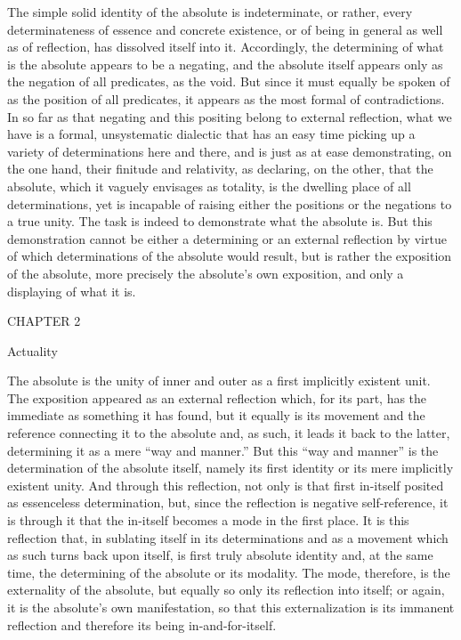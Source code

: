 The simple solid identity of the absolute is indeterminate,
or rather, every determinateness of essence and concrete existence,
or of being in general as well as of reflection,
has dissolved itself into it.
Accordingly, the determining of what is
the absolute appears to be a negating,
and the absolute itself appears only as
the negation of all predicates, as the void.
But since it must equally be spoken of
as the position of all predicates,
it appears as the most formal of contradictions.
In so far as that negating and this positing
belong to external reflection,
what we have is a formal, unsystematic dialectic
that has an easy time picking up
a variety of determinations here and there,
and is just as at ease demonstrating, on the one hand,
their finitude and relativity, as declaring, on the other,
that the absolute, which it vaguely envisages as totality,
is the dwelling place of all determinations,
yet is incapable of raising either
the positions or the negations to a true unity.
The task is indeed to demonstrate what the absolute is.
But this demonstration cannot be either
a determining or an external reflection
by virtue of which determinations of the absolute would result,
but is rather the exposition of the absolute,
more precisely the absolute's own exposition,
and only a displaying of what it is.

CHAPTER 2

Actuality

The absolute is the unity of inner and outer
as a first implicitly existent unit.
The exposition appeared as an external reflection
which, for its part, has the immediate as something it has found,
but it equally is its movement and
the reference connecting it to the absolute
and, as such, it leads it back to the latter,
determining it as a mere “way and manner.”
But this “way and manner” is the determination of the absolute itself,
namely its first identity or its mere implicitly existent unity.
And through this reflection, not only is that
first in-itself posited as essenceless determination,
but, since the reflection is negative self-reference,
it is through it that the in-itself becomes
a mode in the first place.
It is this reflection that, in sublating itself in its
determinations and as a movement which as such turns back upon itself,
is first truly absolute identity
and, at the same time, the determining of
the absolute or its modality.
The mode, therefore, is the externality of the absolute,
but equally so only its reflection into itself;
or again, it is the absolute's own manifestation,
so that this externalization is its immanent reflection
and therefore its being in-and-for-itself.

